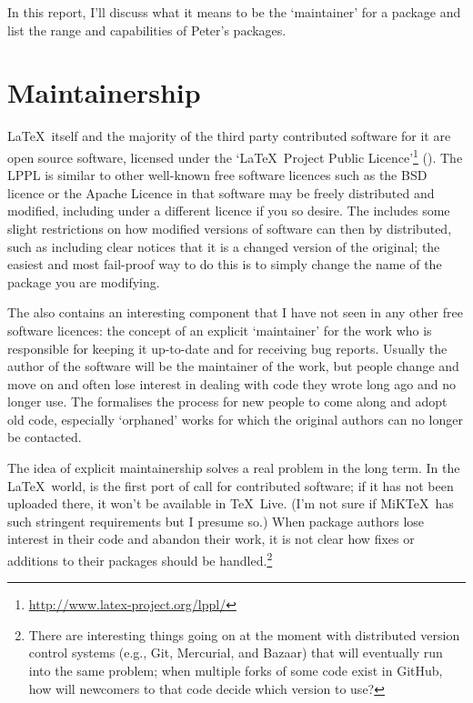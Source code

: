 \documentclass{ltugboat}
\begin{document}
In this report, I'll discuss what it means to be the `maintainer' for a package and list the range and capabilities of Peter's packages.

\section{Maintainership}

\LaTeX\ itself and the majority of the third party contributed software for it are open source software, licensed under the `\LaTeX\ Project Public Licence'\footnote{\url{http://www.latex-project.org/lppl/}} (). The LPPL is similar to other well-known free software licences such as the BSD licence or the Apache Licence in that software may be freely distributed and modified, including under a different licence if you so desire. The  includes some slight restrictions on how modified versions of software can then by distributed, such as including clear notices that it is a changed version of the original; the easiest and most fail-proof way to do this is to simply change the name of the package you are modifying.

The  also contains an interesting component that I have not seen in any other free software licences: the concept of an explicit `maintainer' for the work who is responsible for keeping it up-to-date and for receiving bug reports. Usually the author of the software will be the maintainer of the work, but people change and move on and often lose interest in dealing with code they wrote long ago and no longer use. The  formalises the process for new people to come along and adopt old code, especially `orphaned' works for which the original authors can no longer be contacted.

The idea of explicit maintainership solves a real problem in the long term. In the \LaTeX\ world,  is the first port of call for contributed software; if it has not been uploaded there, it won't be available in \TeX\ Live. (I'm not sure if MiK\TeX\ has such stringent requirements but I presume so.) When package authors lose interest in their code and abandon their work, it is not clear how fixes or additions to their packages should be handled.\footnote{There are interesting things going on at the moment with distributed version control systems (e.g., Git, Mercurial, and Bazaar) that will eventually run into the same problem; when multiple forks of some code exist in GitHub, how will newcomers to that code decide which version to use?}
\end{document}
